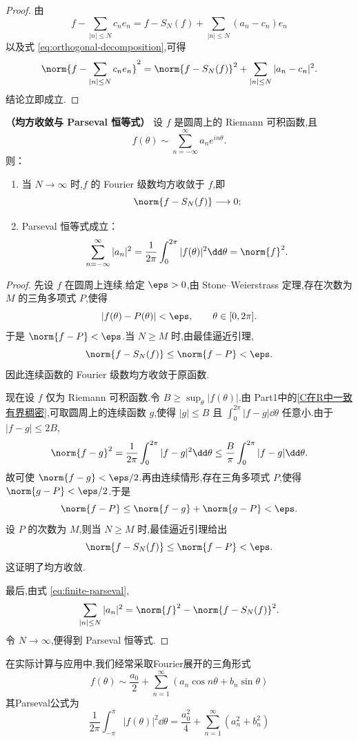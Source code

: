 \begin{proof}
	由
	\[
	f-\sum_{|n|\leq N}c_ne_n
	=f-S_N(f)+\sum_{|n|\leq N}(a_n-c_n)e_n
	\]
	以及式 \eqref{eq:orthogonal-decomposition},可得
	\[
	\norm{f-\sum_{|n|\leq N}c_ne_n}^2
	=\norm{f-S_N(f)}^2+
	\sum_{|n|\leq N}|a_n-c_n|^2.
	\]
	结论立即成立.
\end{proof}

\begin{theorem}
	\textbf{（均方收敛与 Parseval 恒等式）}
	设 $f$ 是圆周上的 Riemann 可积函数,且
	\[
	f(\theta)\sim\sum_{n=-\infty}^{\infty}a_ne^{in\theta}.
	\]
	则：
	\begin{enumerate}
		\item 当 $N\to\infty$ 时,$f$ 的 Fourier 级数均方收敛于 $f$,即
		\[
		\norm{f-S_N(f)}\longrightarrow0;
		\]
		\item Parseval 恒等式成立：
		\[
		\sum_{n=-\infty}^{\infty}|a_n|^2
		=\frac1{2\pi}\int_0^{2\pi}|f(\theta)|^2\dd\theta
		=\norm{f}^2.
		\]
	\end{enumerate}
\end{theorem}

\begin{proof}
	先设 $f$ 在圆周上连续.给定 $\eps>0$,由 Stone--Weierstrass 定理,存在次数为 $M$ 的三角多项式 $P$,使得
	\[
	|f(\theta)-P(\theta)|<\eps,
	\qquad \theta\in[0,2\pi].
	\]
	于是 $\norm{f-P}<\eps$.当 $N\geq M$ 时,由最佳逼近引理,
	\[
	\norm{f-S_N(f)}\leq\norm{f-P}<\eps.
	\]
	因此连续函数的 Fourier 级数均方收敛于原函数.
	
	现在设 $f$ 仅为 Riemann 可积函数.令 $B\geq\sup_{\theta}|f(\theta)|$.由 Part1中的\ref{C在R中一致有界稠密},可取圆周上的连续函数 $g$,使得 $|g|\leq B$ 且 $\displaystyle\int_0^{2\pi}|f-g|\dd\theta$ 任意小.由于 $|f-g|\leq2B$,
	\[
	\norm{f-g}^2
	=\frac1{2\pi}\int_0^{2\pi}|f-g|^2\dd\theta
	\leq\frac{B}{\pi}\int_0^{2\pi}|f-g|\dd\theta.
	\]
	故可使 $\norm{f-g}<\eps/2$.再由连续情形,存在三角多项式 $P$,使得 $\norm{g-P}<\eps/2$.于是
	\[
	\norm{f-P}\leq\norm{f-g}+\norm{g-P}<\eps.
	\]
	设 $P$ 的次数为 $M$,则当 $N\geq M$ 时,最佳逼近引理给出
	\[
	\norm{f-S_N(f)}\leq\norm{f-P}<\eps.
	\]
	这证明了均方收敛.
	
	最后,由式 \eqref{eq:finite-parseval},
	\[
	\sum_{|n|\leq N}|a_n|^2
	=\norm{f}^2-\norm{f-S_N(f)}^2.
	\]
	令 $N\to\infty$,便得到 Parseval 恒等式.
\end{proof}
在实际计算与应用中,我们经常采取Fourier展开的三角形式\[f(\theta)\sim \frac{a_0}{2}+\sum_{n=1}^{\infty}(a_n\cos n\theta+b_n\sin \theta)\]
其Parseval公式为
\[\frac{1}{2\pi}\int_{-\pi}^{\pi}|f(\theta)|^2\dd\theta=\frac{a_0^2}{4}+\sum_{n=1}^{\infty}(a_n^2+b_n^2)\]

